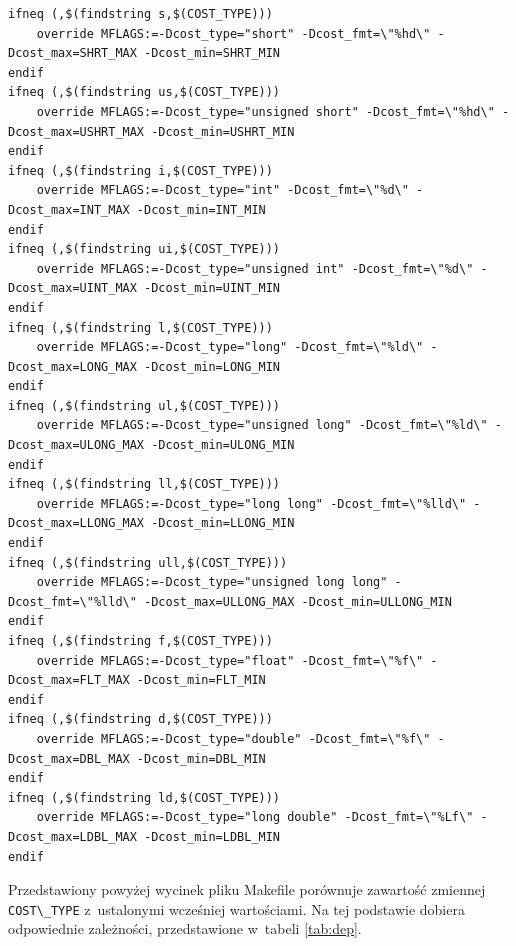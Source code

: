\documentclass[a4paper,12pt,polish,twoside,openright]{thesis}
\newcommand\code[1]{\lstinline[style=line]{#1}}
\begin{document}
\begin{lstlisting}[style=code,caption=Makefile - blok decydujący o zmiennej cost]
ifneq (,$(findstring s,$(COST_TYPE)))
	override MFLAGS:=-Dcost_type="short" -Dcost_fmt=\"%hd\" -Dcost_max=SHRT_MAX -Dcost_min=SHRT_MIN
endif
ifneq (,$(findstring us,$(COST_TYPE)))
	override MFLAGS:=-Dcost_type="unsigned short" -Dcost_fmt=\"%hd\" -Dcost_max=USHRT_MAX -Dcost_min=USHRT_MIN
endif
ifneq (,$(findstring i,$(COST_TYPE)))
	override MFLAGS:=-Dcost_type="int" -Dcost_fmt=\"%d\" -Dcost_max=INT_MAX -Dcost_min=INT_MIN
endif
ifneq (,$(findstring ui,$(COST_TYPE)))
	override MFLAGS:=-Dcost_type="unsigned int" -Dcost_fmt=\"%d\" -Dcost_max=UINT_MAX -Dcost_min=UINT_MIN
endif
ifneq (,$(findstring l,$(COST_TYPE)))
	override MFLAGS:=-Dcost_type="long" -Dcost_fmt=\"%ld\" -Dcost_max=LONG_MAX -Dcost_min=LONG_MIN
endif
ifneq (,$(findstring ul,$(COST_TYPE)))
	override MFLAGS:=-Dcost_type="unsigned long" -Dcost_fmt=\"%ld\" -Dcost_max=ULONG_MAX -Dcost_min=ULONG_MIN
endif
ifneq (,$(findstring ll,$(COST_TYPE)))
	override MFLAGS:=-Dcost_type="long long" -Dcost_fmt=\"%lld\" -Dcost_max=LLONG_MAX -Dcost_min=LLONG_MIN
endif
ifneq (,$(findstring ull,$(COST_TYPE)))
	override MFLAGS:=-Dcost_type="unsigned long long" -Dcost_fmt=\"%lld\" -Dcost_max=ULLONG_MAX -Dcost_min=ULLONG_MIN
endif
ifneq (,$(findstring f,$(COST_TYPE)))
	override MFLAGS:=-Dcost_type="float" -Dcost_fmt=\"%f\" -Dcost_max=FLT_MAX -Dcost_min=FLT_MIN
endif
ifneq (,$(findstring d,$(COST_TYPE)))
	override MFLAGS:=-Dcost_type="double" -Dcost_fmt=\"%f\" -Dcost_max=DBL_MAX -Dcost_min=DBL_MIN
endif
ifneq (,$(findstring ld,$(COST_TYPE)))
	override MFLAGS:=-Dcost_type="long double" -Dcost_fmt=\"%Lf\" -Dcost_max=LDBL_MAX -Dcost_min=LDBL_MIN
endif
\end{lstlisting}

Przedstawiony powyżej wycinek pliku Makefile porównuje zawartość zmiennej \code{COST\_TYPE} z~ustalonymi wcześniej wartościami. Na tej podstawie dobiera odpowiednie zależności, przedstawione w~tabeli \ref{tab:dep}.
\end{document}
